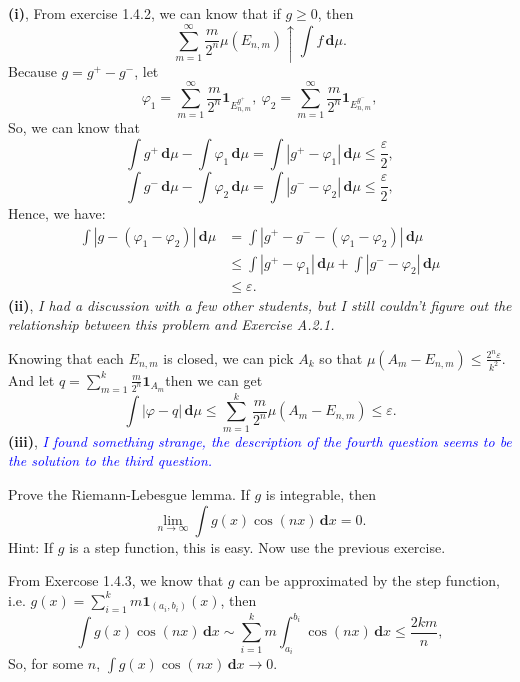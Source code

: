 \documentclass[en, normal, 11pt, black]{elegantnote}
\newenvironment{exercise}[1]{\begin{tcolorbox}[colback=black!15, colframe=black!80, breakable, title=#1]}{\end{tcolorbox}}
\renewenvironment{proof}{\begin{tcolorbox}[colback=white, colframe=black!50, breakable, title=Proof. ]\setlength{\parskip}{0.8em}}{\\\rightline{$\square$}\end{tcolorbox}}
\newenvironment{solution}{\begin{tcolorbox}[colback=white, colframe=black!50, breakable, title=Solution. ]\setlength{\parskip}{0.8em}}{\end{tcolorbox}}
\newcommand{\der}{\,\mathbf{d}}
\begin{document}
    \begin{solution}
        {\large\bf(i)}, From exercise 1.4.2, we can know that if $g\geqslant0$, then 
        \[
            \sum_{m=1}^{\infty} \frac{m}{2^{n}} \mu\left(E_{n, m}\right) \uparrow \int f \der \mu. 
        \]
        Because $g=g^+-g^-$, let 
        \[
            \varphi_1=\sum_{m=1}^\infty\frac{m}{2^n}\mathbf{1}_{E_{n,m}^{g^+}},\ \varphi_2=\sum_{m=1}^\infty\frac{m}{2^n}\mathbf{1}_{E_{n,m}^{g^-}}, 
        \]
        So, we can know that 
        \[\int g^+\der\mu-\int \varphi_1\der\mu=\int|g^+-\varphi_1|\der\mu\leqslant\frac{\varepsilon}{2}, \]
        \[\int g^-\der\mu-\int \varphi_2\der\mu=\int|g^--\varphi_2|\der\mu\leqslant\frac{\varepsilon}{2}, \]
        Hence, we have: 
        \begin{align*}
            \int |g-(\varphi_1-\varphi_2)|\der \mu&=\int |g^+-g^--(\varphi_1-\varphi_2)|\der \mu\\
            &\leqslant\int|g^+-\varphi_1|\der \mu + \int |g^--\varphi_2|\der \mu\\
            &\leqslant\varepsilon. 
        \end{align*}
        {\large\bf(ii)}, \emph{I had a discussion with a few other students, but I still couldn't figure out the relationship between this problem and Exercise A.2.1. }
        
        Knowing that each $E_{n,m}$ is closed, we can pick $A_k$ so that $\mu(A_m-E_{n,m})\leqslant\frac{2^n\varepsilon}{k^2}$. And let $q=\sum_{m=1}^k\frac{m}{2^n}\mathbf{1}_{A_m}$then we can get 
        \[\int|\varphi-q|\der\mu\leqslant\sum_{m=1}^k\frac{m}{2^n}\mu(A_m-E_{n,m})\leqslant\varepsilon. \]
        {\large\bf(iii)}, \textcolor{blue}{\emph{I found something strange, the description of the fourth question seems to be the solution to the third question. }}
    \end{solution}
    
    \begin{exercise}{1.4.4}
        Prove the Riemann-Lebesgue lemma. If $g$ is integrable, then 
        \[
            \lim _{n \rightarrow \infty} \int g(x) \cos(nx) \der x=0. 
        \]
        Hint: If $g$ is a step function, this is easy. Now use the previous exercise. 
    \end{exercise}
    \begin{proof}
        From Exercose 1.4.3, we know that $g$ can be approximated by the step function, i.e. $g(x)=\sum_{i=1}^k m \mathbf{1}_{(a_i, b_i)}(x)$, then 
        \[
            \int g(x) \cos (n x )\der x\sim\sum_{i=1}^k m \int_{a_i}^{b_i} \cos (n x) \der x\leqslant\frac{2km}{n}, 
        \]
        So, for some $n$, $\int g(x) \cos (n x )\der x\rightarrow 0$. 
    \end{proof}
\end{document}
